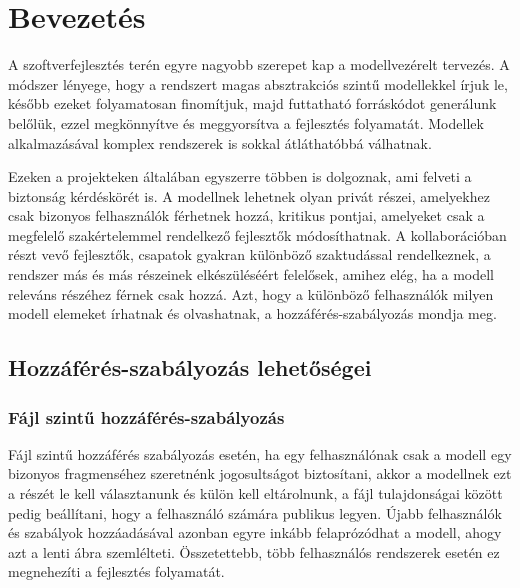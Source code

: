 \chapter{Bevezetés}
A szoftverfejlesztés terén egyre nagyobb szerepet kap a modellvezérelt tervezés. A módszer lényege, hogy a rendszert magas absztrakciós szintű modellekkel írjuk le, később ezeket folyamatosan finomítjuk, majd futtatható forráskódot generálunk belőlük, ezzel megkönnyítve és meggyorsítva a fejlesztés folyamatát. Modellek alkalmazásával komplex rendszerek is sokkal átláthatóbbá válhatnak.

Ezeken a projekteken általában egyszerre többen is dolgoznak, ami felveti a biztonság kérdéskörét is. A modellnek lehetnek olyan privát részei, amelyekhez csak bizonyos felhasználók férhetnek hozzá, kritikus pontjai, amelyeket csak a megfelelő szakértelemmel rendelkező fejlesztők módosíthatnak. A kollaborációban részt vevő fejlesztők, csapatok gyakran különböző szaktudással rendelkeznek, a rendszer más és más részeinek elkészüléséért felelősek, amihez elég, ha a modell releváns részéhez férnek csak hozzá. Azt, hogy a különböző felhasználók milyen modell elemeket írhatnak és olvashatnak, a hozzáférés-szabályozás mondja meg.

\section{Hozzáférés-szabályozás lehetőségei}
\subsection{Fájl szintű hozzáférés-szabályozás}
Fájl szintű hozzáférés szabályozás esetén, ha egy felhasználónak csak a modell egy bizonyos fragmenséhez szeretnénk jogosultságot biztosítani, akkor a modellnek ezt a részét le kell választanunk és külön kell eltárolnunk, a fájl tulajdonságai között pedig beállítani, hogy a felhasználó számára publikus legyen. Újabb felhasználók és szabályok hozzáadásával azonban egyre inkább felaprózódhat a modell, ahogy azt a lenti ábra szemlélteti. Összetettebb, több felhasználós rendszerek esetén ez megnehezíti a fejlesztés folyamatát.

